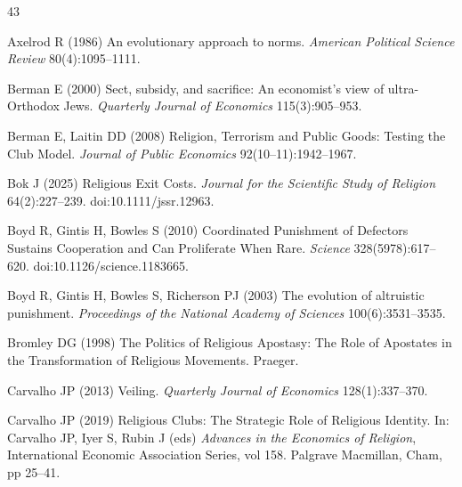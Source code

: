\documentclass[12pt]{article}
\begin{document}
%
\begin{thebibliography}{43}

Axelrod R (1986) An evolutionary approach to norms. \textit{American Political Science Review} 80(4):1095--1111.

Berman E (2000) Sect, subsidy, and sacrifice: An economist's view of ultra-Orthodox Jews. \textit{Quarterly Journal of Economics} 115(3):905--953.

Berman E, Laitin DD (2008) Religion, Terrorism and Public Goods: Testing the Club Model. \textit{Journal of Public Economics} 92(10--11):1942--1967.

Bok J (2025) Religious Exit Costs. \textit{Journal for the Scientific Study of Religion} 64(2):227--239. doi:10.1111/jssr.12963.

Boyd R, Gintis H, Bowles S (2010) Coordinated Punishment of Defectors Sustains Cooperation and Can Proliferate When Rare. \textit{Science} 328(5978):617--620. doi:10.1126/science.1183665.

Boyd R, Gintis H, Bowles S, Richerson PJ (2003) The evolution of altruistic punishment. \textit{Proceedings of the National Academy of Sciences} 100(6):3531--3535.

Bromley DG (1998) The Politics of Religious Apostasy: The Role of Apostates in the Transformation of Religious Movements. Praeger.

Carvalho JP (2013) Veiling. \textit{Quarterly Journal of Economics} 128(1):337--370.

Carvalho JP (2019) Religious Clubs: The Strategic Role of Religious Identity. In: Carvalho JP, Iyer S, Rubin J (eds) \textit{Advances in the Economics of Religion}, International Economic Association Series, vol 158. Palgrave Macmillan, Cham, pp 25--41.


\end{thebibliography}
\end{document}
